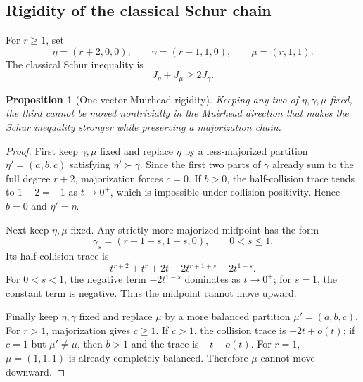 \documentclass[11pt]{article}
\newtheorem{proposition}[theorem]{Proposition}
\theoremstyle{definition}
\begin{document}
\subsection{Rigidity of the classical Schur chain}

For \(r\ge1\), set
\begin{equation*}
\eta=(r+2,0,0),
\qquad
\gamma=(r+1,1,0),
\qquad
\mu=(r,1,1).
\end{equation*}
The classical Schur inequality is
\begin{equation*}
J_\eta+J_\mu\ge2J_\gamma.
\end{equation*}

\begin{proposition}[One-vector Muirhead rigidity]\label{prop:schur-rigidity}
Keeping any two of \(\eta,\gamma,\mu\) fixed, the third cannot be moved nontrivially in the Muirhead direction that makes the Schur inequality stronger while preserving a majorization chain.
\end{proposition}

\begin{proof}
First keep \(\gamma,\mu\) fixed and replace \(\eta\) by a less-majorized partition \(\eta'=(a,b,c)\) satisfying \(\eta'\succ\gamma\).  Since the first two parts of \(\gamma\) already sum to the full degree \(r+2\), majorization forces \(c=0\).  If \(b>0\), the half-collision trace tends to \(1-2=-1\) as \(t\to0^+\), which is impossible under collision positivity.  Hence \(b=0\) and \(\eta'=\eta\).

Next keep \(\eta,\mu\) fixed.  Any strictly more-majorized midpoint has the form
\begin{equation*}
\gamma_s=(r+1+s,1-s,0),
\qquad
0<s\le1.
\end{equation*}
Its half-collision trace is
\begin{equation*}
t^{r+2}+t^r+2t-2t^{r+1+s}-2t^{1-s}.
\end{equation*}
For \(0<s<1\), the negative term \(-2t^{1-s}\) dominates as \(t\to0^+\); for \(s=1\), the constant term is negative.  Thus the midpoint cannot move upward.

Finally keep \(\eta,\gamma\) fixed and replace \(\mu\) by a more balanced partition \(\mu'=(a,b,c)\).  For \(r>1\), majorization gives \(c\ge1\).  If \(c>1\), the collision trace is \(-2t+o(t)\); if \(c=1\) but \(\mu'\ne\mu\), then \(b>1\) and the trace is \(-t+o(t)\).  For \(r=1\), \(\mu=(1,1,1)\) is already completely balanced.  Therefore \(\mu\) cannot move downward.
\end{proof}
\end{document}
